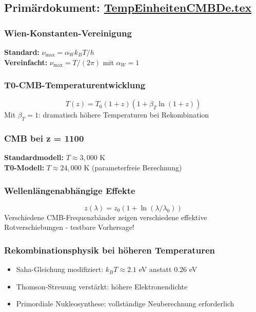 \documentclass[12pt,a4paper]{report}
\begin{document}
	\subsection{Primärdokument: \href{https://github.com/jpascher/T0-Time-Mass-Duality/tree/main/2/pdf/TempEinheitenCMBDe.pdf}{TempEinheitenCMBDe.tex}}
	
	\subsubsection{Wien-Konstanten-Vereinigung}
	\textbf{Standard:} $\nu_{\text{max}} = \alpha_W k_B T/h$\\
	\textbf{Vereinfacht:} $\nu_{\text{max}} = T/(2\pi)$ mit $\alpha_W = 1$
	
	\subsubsection{T0-CMB-Temperaturentwicklung}
	$$T(z) = T_0(1+z)(1 + \beta_T \ln(1+z))$$
	Mit $\beta_T = 1$: dramatisch höhere Temperaturen bei Rekombination
	
	\subsubsection{CMB bei z = 1100}
	\textbf{Standardmodell:} $T \approx 3,000$ K\\
	\textbf{T0-Modell:} $T \approx 24,000$ K (parameterfreie Berechnung)
	
	\subsubsection{Wellenlängenabhängige Effekte}
	$$z(\lambda) = z_0(1 + \ln(\lambda/\lambda_0))$$
	Verschiedene CMB-Frequenzbänder zeigen verschiedene effektive Rotverschiebungen - testbare Vorhersage!
	
	\subsubsection{Rekombinationsphysik bei höheren Temperaturen}
	\begin{itemize}
		\item Saha-Gleichung modifiziert: $k_B T \approx 2.1$ eV anstatt 0.26 eV
		\item Thomson-Streuung verstärkt: höhere Elektronendichte
		\item Primordiale Nukleosynthese: vollständige Neuberechnung erforderlich
	\end{itemize}
	
\end{document}
